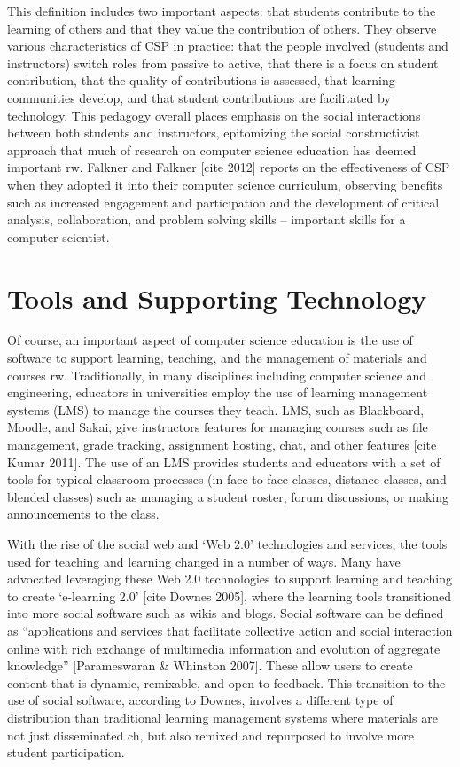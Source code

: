 This definition includes two important aspects: that students contribute to the learning of others and that they value the contribution of others. They observe various characteristics of CSP in practice: that the people involved (students and instructors) switch roles from passive to active, that there is a focus on student contribution, that the quality of contributions is assessed, that learning communities develop, and that student contributions are facilitated by technology. This pedagogy overall places emphasis on the social interactions between both students and instructors, epitomizing the social constructivist approach that much of research on computer science education has deemed important {rw}. Falkner and Falkner [cite 2012] reports on the effectiveness of CSP when they adopted it into their computer science curriculum, observing benefits such as increased engagement and participation and the development of critical analysis, collaboration, and problem solving skills – important skills for a computer scientist.

\section{Tools and Supporting Technology}

Of course, an important aspect of computer science education is the use of software to support learning, teaching, and the management of materials and courses {rw}. Traditionally, in many disciplines including computer science and engineering, educators in universities employ the use of learning management systems (LMS) to manage the courses they teach. LMS, such as Blackboard, Moodle, and Sakai, give instructors features for managing courses such as file management, grade tracking, assignment hosting, chat, and other features [cite Kumar 2011]. The use of an LMS provides students and educators with a set of tools for typical classroom processes (in face-to-face classes, distance classes, and blended classes) such as managing a student roster, forum discussions, or making announcements to the class.

With the rise of the social web and ‘Web 2.0’ technologies and services, the tools used for teaching and learning changed in a number of ways. Many have advocated leveraging these Web 2.0 technologies to support learning and teaching to create ‘e-learning 2.0’ [cite Downes 2005], where the learning tools transitioned into more social software such as wikis and blogs. Social software can be defined as “applications and services that facilitate collective action and social interaction online with rich exchange of multimedia information and evolution of aggregate knowledge” [Parameswaran \& Whinston 2007]. These allow users to create content that is dynamic, remixable, and open to feedback. This transition to the use of social software, according to Downes, involves a different type of distribution than traditional learning management systems where materials are not just disseminated {ch}, but also remixed and repurposed to involve more student participation.

